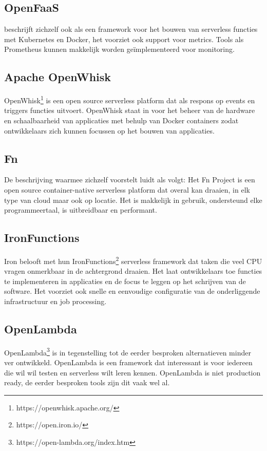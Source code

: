 \subsection{OpenFaaS}
\textcite{OpenFaaS2019} beschrijft zichzelf ook als een framework voor het bouwen van serverless functies met Kubernetes en Docker, het voorziet ook support voor metrics. Tools als Prometheus kunnen makkelijk worden geïmplementeerd voor monitoring.

\subsection{Apache OpenWhisk}
OpenWhisk\footnote{https://openwhisk.apache.org/} is een open source serverless platform dat als respons op events en triggers functies uitvoert. OpenWhisk staat in voor het beheer van de hardware en schaalbaarheid van applicaties met behulp van Docker containers zodat ontwikkelaars zich kunnen focussen op het bouwen van applicaties.

\subsection{Fn}
De beschrijving waarmee \textcite{FnProject2019} zichzelf voorstelt luidt als volgt: Het Fn Project is een open source container-native serverless platform dat overal kan draaien, in elk type van cloud maar ook op locatie. Het is makkelijk in gebruik, ondersteund elke programmeertaal, is uitbreidbaar en performant. 

\subsection{IronFunctions}
Iron belooft met hun IronFunctions\footnote{https://open.iron.io/} serverless framework dat taken die veel CPU vragen onmerkbaar in de achtergrond draaien. Het laat ontwikkelaars toe functies te implementeren in applicaties en de focus te leggen op het schrijven van de software. Het voorziet ook snelle en eenvoudige configuratie van de onderliggende infrastructuur en job processing.

\subsection{OpenLambda}
OpenLambda\footnote{https://open-lambda.org/index.htm} is in tegenstelling tot de eerder besproken alternatieven minder ver ontwikkeld. OpenLambda is een framework dat interessant is voor iedereen die wil wil testen en serverless wilt leren kennen. OpenLambda is niet production ready, de eerder besproken tools zijn dit vaak wel al.

